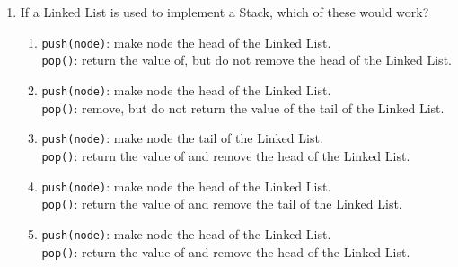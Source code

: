 \documentclass[CS180-S16-FinalExam.tex]{subfiles}
\begin{document}
\begin{enumerate}
\item If a Linked List is used to implement a Stack, which of these would work?
\begin{enumerate}
\item \texttt{push(node)}: make node the head of the Linked List. \\
\texttt{pop()}: return the value of, but do not remove the head of the Linked List.
\item \texttt{push(node)}: make node the head of the Linked List. \\
\texttt{pop()}: remove, but do not return the value of the tail of the Linked List.
\item \texttt{push(node)}: make node the tail of the Linked List. \\
\texttt{pop()}: return the value of and remove the head of the Linked List.
\item \texttt{push(node)}: make node the head of the Linked List.\\
\texttt{pop()}: return the value of and remove the tail of the Linked List.
\item \texttt{push(node)}: make node the head of the Linked List. \\
\texttt{pop()}: return the value of and remove the head of the Linked List.  \ifdraft \Ans \fi 
\end{enumerate}


\end{enumerate}
\end{document}
